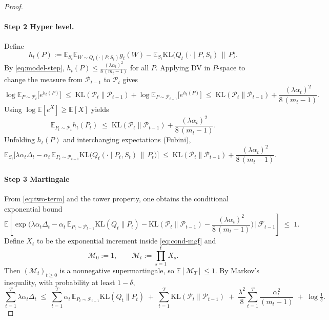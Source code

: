 \documentclass[10pt]{article} %
\begin{document}
\begin{proof}
\paragraph{Step 2 Hyper level.} 
Define
\[
h_t(P):=\mathbb E_{S_t}\mathbb E_{W\sim Q_t(\cdot\mid P,S_t)} g_t(W)
-\mathbb E_{S_t}\mathrm{KL}\!\big(Q_t(\cdot\mid P,S_t)\,\|\,P\big).
\]
By \eqref{eq:model-step}, $h_t(P)\le \frac{(\lambda\alpha_t)^2}{8\,(m_t-1)}$ for all $P$.
Applying DV in $P$-space to change the measure from $\mathcal P_{t-1}$ to $\mathcal P_t$ gives
\begin{equation}
\label{eq:dv-p}
\log\mathbb E_{P\sim\mathcal P_t}\!\big[e^{h_t(P)}\big]
\;\le\; \mathrm{KL}(\mathcal P_t\|\mathcal P_{t-1})
+\log\mathbb E_{P\sim\mathcal P_{t-1}}\!\big[e^{h_t(P)}\big]
\;\le\; \mathrm{KL}(\mathcal P_t\|\mathcal P_{t-1})
+\frac{(\lambda\alpha_t)^2}{8\,(m_t-1)}.
\end{equation}
Using $\log\mathbb E[e^X]\ge \mathbb E[X]$ yields
\begin{equation}
\label{eq:p-expect}
\mathbb E_{P_t\sim\mathcal P_t} h_t(P_t)
\;\le\; \mathrm{KL}(\mathcal P_t\|\mathcal P_{t-1})
+\frac{(\lambda\alpha_t)^2}{8\,(m_t-1)}.
\end{equation}
Unfolding $h_t(P)$ and interchanging expectations (Fubini),
\begin{equation}
\label{eq:two-term}
\mathbb E_{S_t}\Big[
\lambda\alpha_t\Delta_t
-\alpha_t\,\mathbb E_{P_t\sim\mathcal P_{t-1}}\mathrm{KL}\!\big(Q_t(\cdot\mid P_t,S_t)\,\|\,P_t\big)
\Big]
\;\le\;
\mathrm{KL}(\mathcal P_t\|\mathcal P_{t-1})
+\frac{(\lambda\alpha_t)^2}{8\,(m_t-1)}.
\end{equation}

\paragraph{Step 3 Martingale}
From \eqref{eq:two-term} and the tower property, one obtains the conditional exponential bound
\begin{equation}
\label{eq:cond-mgf}
\mathbb E\!\left[
\exp\!\Big(
\lambda\alpha_t\Delta_t
-\alpha_t\,\mathbb E_{P_t\sim\mathcal P_{t-1}}\mathrm{KL}(Q_t\|P_t)
-\mathrm{KL}(\mathcal P_t\|\mathcal P_{t-1})
-\frac{(\lambda\alpha_t)^2}{8\,(m_t-1)}
\Big)\,\Big|\,\mathcal F_{t-1}\right]\;\le\;1.
\end{equation}
Define $X_t$ to be the exponential increment inside \eqref{eq:cond-mgf} and
\[
\mathcal{M}_0:=1,\qquad
\mathcal{M}_t:=\prod_{s=1}^t X_s.
\]
Then $(\mathcal{M}_t)_{t\ge0}$ is a nonnegative supermartingale, so
$\mathbb E[\mathcal{M}_T]\le 1$.
By Markov's inequality, with probability at least $1-\delta$,
\begin{equation}
\label{eq:hpp}
\sum_{t=1}^T \lambda\alpha_t\Delta_t
\;\le\;
\sum_{t=1}^T \alpha_t\,\mathbb E_{P_t\sim\mathcal P_{t-1}}\mathrm{KL}(Q_t\|P_t)
\;+\; \sum_{t=1}^T \mathrm{KL}(\mathcal P_t\|\mathcal P_{t-1})
\;+\; \frac{\lambda^2}{8}\sum_{t=1}^T \frac{\alpha_t^2}{(m_t-1)}
\;+\; \log\tfrac1\delta.
\end{equation}


\end{proof}
\end{document}
